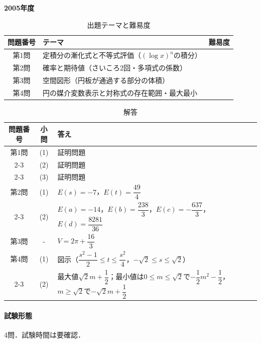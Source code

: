 \documentclass[../../main.tex]{subfiles}
\begin{document}
\begin{center}
  {\fontsize{48pt}{58pt}\selectfont \textbf{2005}\normalsize\textbf{年度}}
\end{center}

\begin{table}[htb]
  \centering
  \caption{出題テーマと難易度}
  \begin{tabular}{|c|p{9cm}|c|}
    \hline
    \textbf{問題番号} & \textbf{テーマ} & \textbf{難易度} \\
    \hline
    第1問 & 定積分の漸化式と不等式評価（$(\log x)^n$の積分） & \\
    \hline
    第2問 & 確率と期待値（さいころ2回・多項式の係数） & \\
    \hline
    第3問 & 空間図形（円板が通過する部分の体積） & \\
    \hline
    第4問 & 円の媒介変数表示と対称式の存在範囲・最大最小 & \\
    \hline
  \end{tabular}
\end{table}

\begin{table}[htb]
  \centering
  \caption{解答}
  \renewcommand{\arraystretch}{1.4}
  \begin{tabular}{|c|c|p{9cm}|}
    \hline
    \textbf{問題番号} & \textbf{小問} & \textbf{答え} \\
    \hline
    第1問 & (1) & 証明問題 \\
    \cline{2-3}
    & (2) & 証明問題 \\
    \cline{2-3}
    & (3) & 証明問題 \\
    \hline
    第2問 & (1) & $E(s)=-7$，$E(t)=\dfrac{49}{4}$ \\
    \cline{2-3}
    & (2) & $E(a)=-14$，$E(b)=\dfrac{238}{3}$，$E(c)=-\dfrac{637}{3}$，$E(d)=\dfrac{8281}{36}$ \\
    \hline
    第3問 & - & $V=2\pi+\dfrac{16}{3}$ \\
    \hline
    第4問 & (1) & 図示（$\dfrac{s^2-1}{2}\le t\le\dfrac{s^2}{4}$，$-\sqrt{2}\le s\le\sqrt{2}$） \\
    \cline{2-3}
    & (2) & 最大値$\sqrt{2}m+\dfrac{1}{2}$；最小値は$0\le m\le\sqrt{2}$で$-\dfrac{1}{2}m^2-\dfrac{1}{2}$，$m\ge\sqrt{2}$で$-\sqrt{2}m+\dfrac{1}{2}$ \\
    \hline
  \end{tabular}
\end{table}

\paragraph{試験形態}
4問．試験時間は要確認．
\end{document}

